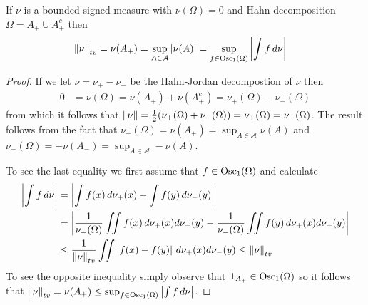 \begin{prop}\label{TotalVariationNormAlternativeFormulasCenteredMeasures}If $\nu$ is a bounded signed measure with $\nu(\Omega) = 0$ and Hahn decomposition $\Omega = A_+ \cup A_+^c$ then 
\begin{align*}
\tvnorm{\nu} &= \nu(A_+) = \sup_{A \in \mathcal{A}} \abs{\nu(A)} = \sup_{f \in \Osc1(\Omega)} \abs{\int f \, d\nu}
\end{align*}
\end{prop}
\begin{proof}
If we let $\nu = \nu_+ - \nu_-$ be the Hahn-Jordan decompostion of $\nu$ then 
\begin{align*}
0 &= \nu(\Omega) = \nu(A_+) + \nu(A_+^c) = \nu_+(\Omega) - \nu_-(\Omega) 
\end{align*}
from which it follows that $\left \lVert \nu \right \rVert = \frac{1}{2}(\nu_+(\Omega) + \nu_-(\Omega)) = \nu_+(\Omega) = \nu_-(\Omega)$.  The result follows from the fact that $\nu_+(\Omega) = \nu(A_+) = \sup_{A \in \mathcal{A}} \nu(A)$ and $\nu_-(\Omega) = -\nu(A_-) = \sup_{A \in \mathcal{A}} -\nu(A)$.

To see the last equality we first assume that $f \in \Osc1(\Omega)$ and calculate
\begin{align*}
\left \vert \int f \, d\nu \right \vert &= \left \vert \int f(x) \, d\nu_+(x) - \int f(y) \, d\nu_-(y) \right \vert \\
&= \left \vert \frac{1}{\nu_-(\Omega)} \iint f(x) \, d\nu_+(x) d\nu_-(y) - \frac{1}{\nu_-(\Omega)}\iint f(y) \, d \nu_+(x) d\nu_+(y) \right \vert \\
&\leq \frac{1}{\left \lVert  \nu \right \rVert_{tv}} \iint \left \vert  f(x) - f(y)  \right \vert \, d\nu_+(x) d\nu_-(y)  \leq \left \lVert  \nu \right \rVert_{tv} \\
\end{align*}
To see the opposite inequality simply observe that $\characteristic{A_+} \in \Osc1(\Omega)$ so it follows that $\tvnorm{\nu}  = \nu(A_+) \leq \sup_{f \in \Osc1(\Omega)} \abs{\int f \, d\nu}$.
\end{proof}


